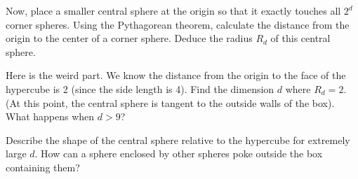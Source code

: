 \documentclass{article}
\begin{document}
Now, place a smaller central sphere at the origin so that it exactly touches all \(2^d\) corner spheres. Using the Pythagorean theorem, calculate the distance from the origin to the center of a corner sphere. Deduce the radius \(R_d\) of this central sphere.

Here is the weird part. We know the distance from the origin to the face of the hypercube is 2 (since the side length is 4). Find the dimension \(d\) where \(R_d = 2\). (At this point, the central sphere is tangent to the outside walls of the box). What happens when \(d > 9\)?

Describe the shape of the central sphere relative to the hypercube for extremely large \(d\). How can a sphere enclosed by other spheres poke outside the box containing them?
\end{document}
